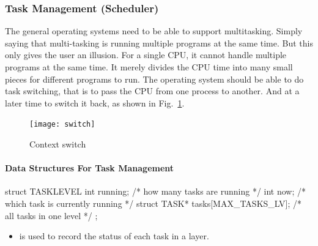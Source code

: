 \documentclass{swfcthesis}
\begin{document}
\subsubsection{Task Management (Scheduler)}
\label{sec:task-management}

The general operating systems need to be able to support multitasking. Simply saying that
multi-tasking is running multiple programs at the same time. But this only gives the user
an illusion. For a single CPU, it cannot handle multiple programs at the same time. It
merely divides the CPU time into many small pieces for different programs to run. The
operating system should be able to do task switching, that is to pass the CPU from one
process to another. And at a later time to switch it back, as shown in
Fig.~\ref{fig:ctxt-switch}. 

\begin{figure}
  \centering
  \begin{center}
    \texttt{[image: switch]}
  \end{center}
  \caption{Context switch}
  \label{fig:ctxt-switch}
\end{figure}

\paragraph{Data Structures For Task Management}

\begin{codeblock}[1]
\begin{ccode}
struct TASKLEVEL
{ 
  int running; /* how many tasks are running */
  int now;     /* which task is currently running */
  struct TASK* tasks[MAX_TASKS_LV]; /* all tasks in one level */
};
\end{ccode}
\end{codeblock}
\begin{itemize}
\item is used to record the status of each task in a layer.
\end{itemize}
\end{document}
